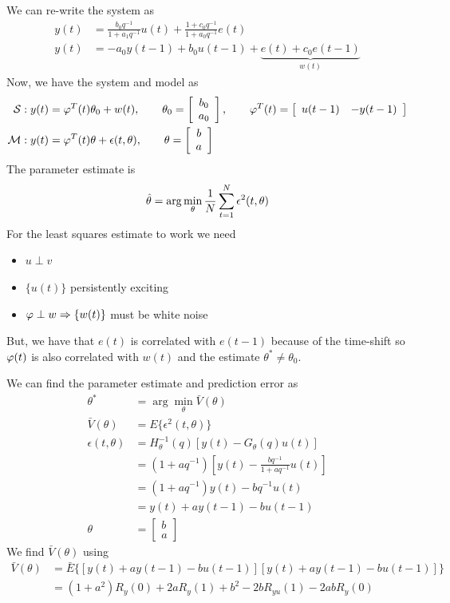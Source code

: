 \begin{example}
We can re-write the system as
\begin{align*}
y(t) &= \frac{b_0q^{-1}}{1+a_1q^{-1}}u(t) + \frac{1+c_0q^{-1}}{1+a_0q^{-1}}e(t) \\
y(t) &= -a_0y(t-1) + b_0u(t-1) + \underbrace{e(t) + c_0e(t-1)}_{w(t)}
\end{align*}
Now, we have the system and model as
\begin{align*}
\mathcal{S}: y(t) &= \varphi^T(t)\theta_0+w(t), \qquad \theta_0=\left[\begin{array}{c}b_0\\a_0\end{array}\right], \qquad \varphi^T(t) = \left[\begin{array}{c c} u(t-1) & -y(t-1) \end{array}\right] \\
\mathcal{M}: y(t) &= \varphi^T(t)\theta+\epsilon(t,\theta), \qquad \theta=\left[\begin{array}{c}b\\a\end{array}\right]
\end{align*}
The parameter estimate is
$$\hat{\theta} = \arg\min_\theta\frac{1}{N}\sum_{t=1}^N\epsilon^2(t,\theta)$$
For the least squares estimate to work we need
\begin{itemize}
\item $u\perp v$
\item $\{u(t)\}$ persistently exciting
\item $\varphi\perp w\Rightarrow\{w(t)\}$ must be white noise
\end{itemize}
But, we have that $e(t)$ is correlated with $e(t-1)$ because of the time-shift so $\varphi(t)$ is also correlated with $w(t)$ and the estimate $\theta^\ast\neq\theta_0$.

We can find the parameter estimate and prediction error as
\begin{align*}
\theta^\ast &= \arg\min_\theta\bar{V}(\theta) \\
\bar{V}(\theta) &= E\{\epsilon^2(t,\theta)\} \\
\epsilon(t,\theta) &= H_\theta^{-1}(q)[y(t)-G_\theta(q)u(t)] \\
&= (1+aq^{-1})\left[y(t) - \frac{bq^{-1}}{1+aq^{-1}}u(t)\right] \\
&= (1+aq^{-1})y(t) - bq^{-1}u(t) \\
&= y(t)+ay(t-1)-bu(t-1) \\
\theta &= \left[\begin{array}{c} b \\ a \end{array}\right]
\end{align*}
We find $\bar{V}(\theta)$ using
\begin{align*}
\bar{V}(\theta) &= \bar{E}\{[y(t)+ay(t-1)-bu(t-1)][y(t)+ay(t-1)-bu(t-1)]\} \\
&= (1+a^2)R_y(0) + 2aR_y(1) + b^2 - 2bR_{yu}(1) - 2abR_y(0)
\end{align*}


\end{example}
